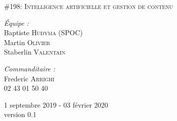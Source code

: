 \begin{titlepage}
\begin{center}
\vspace{0.4cm}
\textsc {\large \#198: Intelligence artificielle et gestion de contenu }\\[1.5cm]

\vspace{7cm}

\begin{minipage}{0.4\textwidth}
\begin{flushleft} \large
	\emph{Équipe :}\\
	Baptiste \textsc{Hudyma} (SPOC)\\
	Martin \textsc{Olivier}\\
	Staberlin \textsc{Valentain}
\end{flushleft}
\end{minipage}
\begin{minipage}{0.5\textwidth}
\begin{flushright} \large
	\emph{Commanditaire :}\\
	Frederic \textsc{Arrighi}\\
	02 43 01 50 40
\end{flushright}
\end{minipage}

\vfill

{\large 1\ier{} septembre 2019 - 03 février 2020}\\
{version 0.1}

\end{center}
\end{titlepage}
